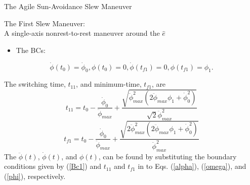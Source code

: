 \documentclass{beamer}
\begin{document}
\begin{frame}{The Agile Sun-Avoidance Slew Maneuver}
\begin{block}{The First Slew Maneuver: \\ A single-axis nonrest-to-rest maneuver around the $\hat{e}$}

\begin{itemize}
\item The BCs: 
\end{itemize}
\begin{equation}\label{Bc1}
\dot{\phi}(t_0)=\dot{\phi}_{0},\phi(t_0)=0, \dot{\phi}(t_{f1})=0,\phi(t_{f1})=\phi_1.
\end{equation}

 The switching time, $t_{11}$, and minimum-time, $t_{f1}$, are
\begin{equation}\label{t11}
t_{11}=t_0-\frac{\dot{\phi}_0}{\ddot{\phi}_{max}}+\frac{\sqrt{\ddot{\phi}_{max}^2(2\ddot{\phi}_{max}\phi_1+\dot{\phi}_{0}^2)}}{\sqrt{2}\ddot{\phi}_{max}^2}
\end{equation}
\begin{equation}\label{tf1}
t_{f1}=t_0-\frac{\dot{\phi}_0}{\ddot{\phi}_{max}}+\frac{\sqrt{2\ddot{\phi}_{max}^2(2\ddot{\phi}_{max}\phi_1+\dot{\phi}_{0}^2)}}{\ddot{\phi}_{max}^2}
\end{equation}
The $\ddot{\phi}(t)$, $\dot{\phi}(t)$, and  $\phi(t)$,  can be found by substituting the boundary conditions given by (\ref{Bc1}) and $t_{11}$ and $t_{f1}$ in to Eqs. (\ref{alpha}), (\ref{omega}), and (\ref{phi}), respectively.
\end{block}
\end{frame}
\end{document}
